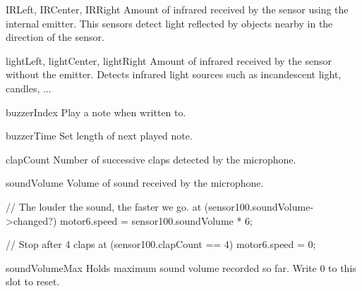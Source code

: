 \begin{urbiscriptapi}

\item[IRLeft, IRCenter, IRRight] Amount of infrared received by the sensor
  using the internal emitter. This sensors detect light reflected by objects
  nearby in the direction of the sensor.

\item[lightLeft, lightCenter, lightRight] Amount of infrared received by the
  sensor without the emitter. Detects infrared light sources such as
  incandescent light, candles, ...

\item[buzzerIndex]
  Play a note when written to.

\item[buzzerTime]
  Set length of next played note.

\item[clapCount]
  Number of successive claps detected by the microphone.

\item[soundVolume]
  Volume of sound received by the microphone.

\begin{urbiunchecked}
// The louder the sound, the faster we go.
at (sensor100.soundVolume->changed?)
  motor6.speed = sensor100.soundVolume * 6;

// Stop after 4 claps
at (sensor100.clapCount == 4)
  motor6.speed = 0;
\end{urbiunchecked}

\item[soundVolumeMax] Holds maximum sound volume recorded so far. Write 0 to
  this slot to reset.

\end{urbiscriptapi}


